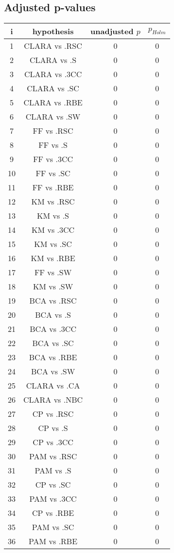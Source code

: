 \documentclass[a4paper,10pt]{article}
\begin{document}
\begin{landscape}
\subsection{Adjusted p-values}

\begin{table}[!htp]
\centering\scriptsize
\begin{tabular}{cccc}
i&hypothesis&unadjusted $p$&$p_{Holm}$\\
\hline1&CLARA vs .RSC&0&0\\
2&CLARA vs .S&0&0\\
3&CLARA vs .3CC&0&0\\
4&CLARA vs .SC&0&0\\
5&CLARA vs .RBE&0&0\\
6&CLARA vs .SW&0&0\\
7&FF vs .RSC&0&0\\
8&FF vs .S&0&0\\
9&FF vs .3CC&0&0\\
10&FF vs .SC&0&0\\
11&FF vs .RBE&0&0\\
12&KM vs .RSC&0&0\\
13&KM vs .S&0&0\\
14&KM vs .3CC&0&0\\
15&KM vs .SC&0&0\\
16&KM vs .RBE&0&0\\
17&FF vs .SW&0&0\\
18&KM vs .SW&0&0\\
19&BCA vs .RSC&0&0\\
20&BCA vs .S&0&0\\
21&BCA vs .3CC&0&0\\
22&BCA vs .SC&0&0\\
23&BCA vs .RBE&0&0\\
24&BCA vs .SW&0&0\\
25&CLARA vs .CA&0&0\\
26&CLARA vs .NBC&0&0\\
27&CP vs .RSC&0&0\\
28&CP vs .S&0&0\\
29&CP vs .3CC&0&0\\
30&PAM vs .RSC&0&0\\
31&PAM vs .S&0&0\\
32&CP vs .SC&0&0\\
33&PAM vs .3CC&0&0\\
34&CP vs .RBE&0&0\\
35&PAM vs .SC&0&0\\
36&PAM vs .RBE&0&0\\

\end{tabular}
\end{table}
\end{landscape}
\end{document}
